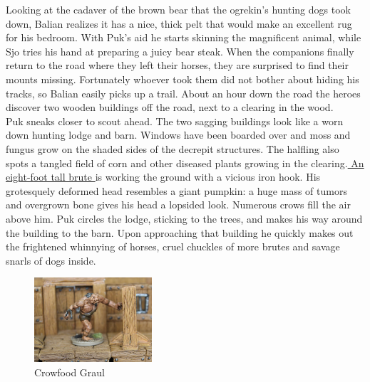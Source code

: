 Looking at the cadaver of the brown bear that the ogrekin's hunting dogs took down, Balian realizes it has a nice, thick pelt that would make an excellent rug for his bedroom. With Puk's aid he starts skinning the magnificent animal, while Sjo tries his hand at preparing a juicy bear steak. When the companions finally return to the road where they left their horses, they are surprised to find their mounts missing. Fortunately whoever took them did not bother about hiding his tracks, so Balian easily picks up a trail. About an hour down the road the heroes discover two wooden buildings off the road, next to a clearing in the wood.\\

Puk sneaks closer to scout ahead. The two sagging buildings look like a worn down hunting lodge and barn. Windows have been boarded over and moss and fungus grow on the shaded sides of the decrepit structures. The halfling also spots a tangled field of corn and other diseased plants growing in the clearing.\hyperref[fig:Crowfood-Graul-507695369]{ An eight-foot tall brute } is working the ground with a vicious iron hook. His grotesquely deformed head resembles a giant pumpkin: a huge mass of tumors and overgrown bone gives his head a lopsided look. Numerous crows fill the air above him. Puk circles the lodge, sticking to the trees, and makes his way around the building to the barn. Upon approaching that building he quickly makes out the frightened whinnying of horses, cruel chuckles of more brutes and savage snarls of dogs inside. \\

\begin{figure}[h]
	\centering
	\includegraphics[width=0.39\textwidth]{images/Crowfood-Graul-507695369.jpg}
	\caption{Crowfood Graul}
	\label{fig:Crowfood-Graul-507695369}
\end{figure}

